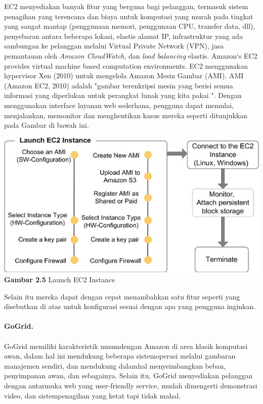 \tab EC2 menyediakan banyak fitur yang berguna bagi pelanggan, termasuk sistem penagihan yang terencana dan biaya untuk komputasi yang murah pada tingkat yang sangat mantap (penggunaan memori, penggunaan CPU, transfer data, dll), penyebaran antara beberapa lokasi, elastis alamat IP, infrastruktur yang ada sambungan ke pelanggan melalui Virtual Private Network (VPN), jasa pemantauan oleh \textit{Amazon CloudWatch}, dan \textit{load balancing} elastis. Amazon‘s EC2 provides virtual machine based computation environments. EC2 menggunakan hypervisor Xen (2010) untuk mengelola Amazon Mesin Gambar (AMI). AMI (Amazon EC2, 2010) adalah "gambar terenkripsi mesin yang berisi semua informasi yang diperlukan untuk perangkat lunak yang kita pakai ". Dengan menggunakan interface layanan web sederhana, pengguna dapat memulai, menjalankan, memonitor dan menghentikan kasus mereka seperti ditunjukkan pada Gambar di bawah ini.\\
\begin{center}
\includegraphics[scale=1]{gambar25.jpg} \\
\textbf{Gambar  2.5} Launch EC2 Instance 
\end{center}
Selain itu mereka dapat dengan cepat menambahkan satu fitur seperti yang disebutkan di atas untuk konfigurasi sesuai  dengan apa yang pengguna inginkan.\\\\
\textbf{GoGrid.}\\\\
GoGrid memiliki  karakteristik umumdengan Amazon di area klasik komputasi  awan,  dalam hal ini mendukung beberapa sistemoperasi melalui gambaran manajemen sendiri, dan mendukung dalamhal menyeimbangkan beban, penyimpanan awan, dan sebagainya. Selain itu, GoGrid menyediakan pelanggan dengan antarmuka web yang user-friendly service, mudah dimengerti demonstrasi video, dan sistempenagihan yang ketat tapi tidak  mahal.\\
